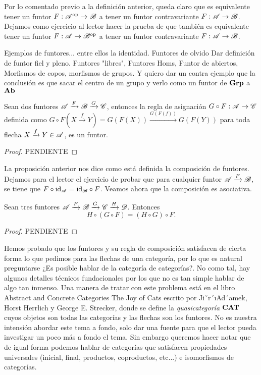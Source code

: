 \documentclass{comunicaciones}
\begin{document}
Por lo comentado previo a la definición anterior, queda claro que es equivalente tener un funtor $F:\mathscr A^{\mathrm{op}}\to\mathscr B$ a tener un funtor contravariante $F:\mathscr A\to\mathscr B$.
Dejamos como ejercicio al lector hacer la prueba de que también es equivalente tener un funtor $F:\mathscr A\to\mathscr B^{\mathrm{op}}$ a tener un funtor contravariante $F:\mathscr A\to\mathscr B$.

Ejemplos de funtores... entre ellos la identidad. Funtores de olvido Dar definición de funtor fiel y pleno. Funtores "libres", Funtores Homs, Funtor de abiertos, Morfismos de copos, morfismos de grupos. 
Y quiero dar un contra ejemplo que la conclusión es que sacar el centro de un grupo y verlo como un funtor de $\mathbf{Grp}$ a $\mathbf{Ab}$

\begin{prop}
    Sean dos funtores $\mathscr A\xrightarrow{F}\mathscr B\xrightarrow{G}\mathscr C$, entonces la regla de asignación $G\circ F:\mathscr A\to\mathscr C$ definida como 
    $G\circ F(X\xrightarrow{f}Y)=G(F(X))\xrightarrow{G(F(f))}G(F(Y))$ para toda flecha $X\xrightarrow{f}Y\in\mathscr A$, es un funtor.
\end{prop}
\begin{proof}
    PENDIENTE
\end{proof}

La proposición anterior nos dice como está definida la composición de funtores. Dejamos para el lector el ejercicio de probar que para cualquier funtor $\mathscr A\xrightarrow{F}\mathscr B$, se tiene que $F\circ\mathrm{id}_\mathscr A=\mathrm{id}_\mathscr B\circ F$.
Veamos ahora que la composición es asociativa.

\begin{prop}
    Sean tres funtores $\mathscr A\xrightarrow{F}\mathscr B\xrightarrow{G}\mathscr C\xrightarrow{H}\mathscr D$. Entonces $$H\circ(G\circ F)=(H\circ G)\circ F.$$
\end{prop}
\begin{proof}
    PENDIENTE
\end{proof}

Hemos probado que los funtores y su regla de composición satisfacen de cierta forma lo que pedimos para las flechas de una categoría, por lo que es natural preguntarse
¿Es posible hablar de la categoría de categorías?. No como tal, hay algunos detalles técnicos fundacionales por los que no es tan simple hablar de algo tan inmenso. Una manera de
tratar con este problema está en el libro Abstract and Concrete Categories The Joy of Cats escrito por Jiˇr´ıAd´amek, Horst Herrlich y George E. Strecker, donde se define la 
\emph{quasicategoría} $\mathbf{CAT}$ cuyos objetos son todas las categorías y las flechas son los funtores. No es nuestra intensión abordar este tema a fondo, 
solo dar una fuente para que el lector pueda investigar un poco más a fondo el tema. Sin embargo queremos hacer notar que de igual forma podemos
hablar de categorías que satisfacen propiedades universales (inicial, final, productos, coproductos, etc...) e isomorfismos de categorías.
\end{document}

